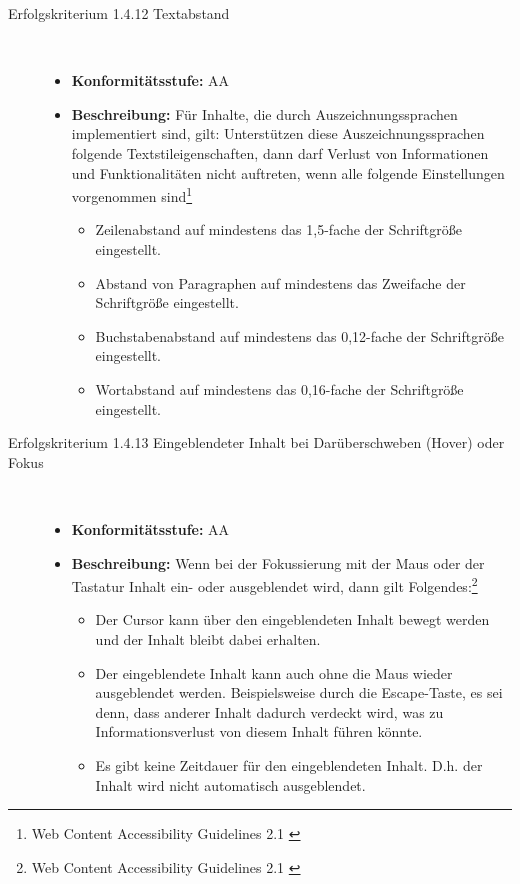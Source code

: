 \begin{description}
\begin{description}
		\item [Erfolgskriterium 1.4.12 Textabstand]\hfill \\
		\begin{itemize}
			\item \textbf{Konformitätsstufe:} AA
			\item \textbf{Beschreibung:} Für Inhalte, die durch Auszeichnungssprachen implementiert sind, gilt: Unterstützen diese Auszeichnungssprachen folgende
			 Textstileigenschaften, dann darf Verlust von Informationen und Funktionalitäten nicht auftreten, wenn alle folgende Einstellungen vorgenommen 
			sind\footnote{Web Content Accessibility Guidelines 2.1 \cite{WCAG2.1}}
			\begin{itemize}
				\item Zeilenabstand auf mindestens das 1,5-fache der Schriftgröße eingestellt.
				\item Abstand von Paragraphen auf mindestens das Zweifache der Schriftgröße eingestellt.
				\item Buchstabenabstand auf mindestens das 0,12-fache der Schriftgröße eingestellt.
				\item Wortabstand auf mindestens das 0,16-fache der Schriftgröße eingestellt.
			\end{itemize}
		\end{itemize}
		
		\item [Erfolgskriterium 1.4.13 Eingeblendeter Inhalt bei Darüberschweben (Hover) oder Fokus]\hfill \\
		\begin{itemize}
			\item \textbf{Konformitätsstufe:} AA
			\item \textbf{Beschreibung:} Wenn bei der Fokussierung mit der Maus oder der Tastatur Inhalt ein- oder ausgeblendet wird, dann gilt 
			Folgendes:\footnote{Web Content Accessibility Guidelines 2.1 \cite{WCAG2.1}}
			\begin{itemize}
				\item Der Cursor kann über den eingeblendeten Inhalt bewegt werden und der Inhalt bleibt dabei erhalten.
				\item Der eingeblendete Inhalt kann auch ohne die Maus wieder ausgeblendet werden. Beispielsweise durch die Escape-Taste, es sei denn, dass anderer Inhalt dadurch 
				verdeckt wird, was zu Informationsverlust von diesem Inhalt führen könnte.
				\item Es gibt keine Zeitdauer für den eingeblendeten Inhalt. D.h. der Inhalt wird nicht automatisch ausgeblendet.
			\end{itemize}
		\end{itemize}
	\end{description}


\end{description}
